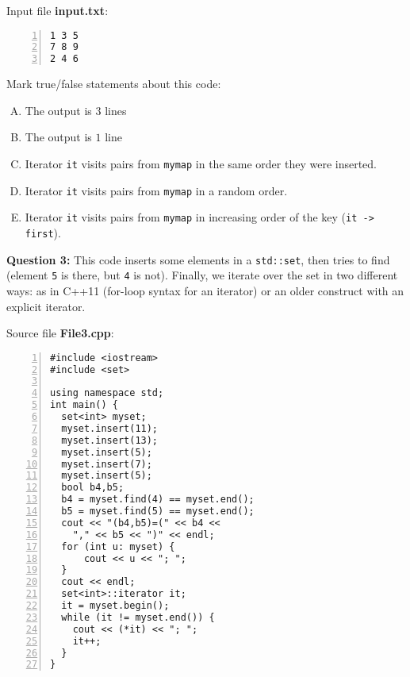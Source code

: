 \documentclass[11pt]{article}
\begin{document}
\vspace{10pt}
Input file {\bf input.txt}:
{\footnotesize
\begin{center}
\begin{minipage}{.85\columnwidth}
\begin{Verbatim}[frame=single,numbers=left]
1 3 5
7 8 9
2 4 6
\end{Verbatim}
\end{minipage}
\end{center}
}

Mark true/false statements about this code:

\begin{enumerate}[(A)]
\item The output is $3$ lines
\item The output is $1$ line
\item Iterator {\tt it} visits pairs from {\tt mymap} in the same order they were inserted.
\item Iterator {\tt it} visits pairs from {\tt mymap} in a random order. 
\item Iterator {\tt it} visits pairs from {\tt mymap} in increasing order 
of the key ({\tt it -> first}). 
\end{enumerate}






\newpage
\vspace{20pt}
{\bf Question 3:} This code inserts some elements in 
a {\tt std::set}, then tries to find 
(element {\tt 5} is there, but {\tt 4} is not). 
Finally, we iterate over the set in two different ways: 
as in C++11 (for-loop syntax for an iterator) or 
an older construct with an explicit iterator.


\vspace{10pt}
Source file {\bf File3.cpp}:
{\footnotesize
\begin{center}
\begin{minipage}{.85\columnwidth}
\begin{Verbatim}[frame=single,numbers=left]
#include <iostream>
#include <set>

using namespace std;
int main() {
  set<int> myset;
  myset.insert(11);
  myset.insert(13);
  myset.insert(5);
  myset.insert(7);
  myset.insert(5);
  bool b4,b5;
  b4 = myset.find(4) == myset.end();
  b5 = myset.find(5) == myset.end();
  cout << "(b4,b5)=(" << b4 << 
    "," << b5 << ")" << endl;
  for (int u: myset) {
      cout << u << "; ";
  } 
  cout << endl;
  set<int>::iterator it;
  it = myset.begin();
  while (it != myset.end()) {
    cout << (*it) << "; ";
    it++;
  }
}
\end{Verbatim}
\end{minipage}
\end{center}
}
\end{document}
